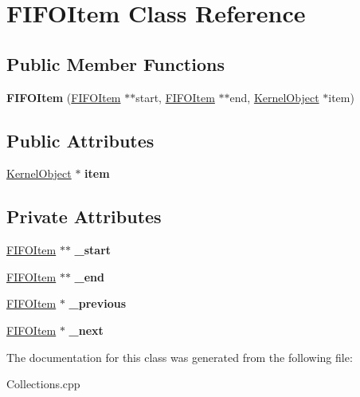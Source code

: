 \hypertarget{class_f_i_f_o_item}{}\section{F\+I\+F\+O\+Item Class Reference}
\label{class_f_i_f_o_item}
\subsection*{Public Member Functions}
\begin{DoxyCompactItemize}
\item 
\mbox{\label{class_f_i_f_o_item_a7650d9cf486522770f8092db4e723dd6}} 
{\bfseries F\+I\+F\+O\+Item} (\hyperlink{class_f_i_f_o_item}{F\+I\+F\+O\+Item} $\ast$$\ast$start, \hyperlink{class_f_i_f_o_item}{F\+I\+F\+O\+Item} $\ast$$\ast$end, \hyperlink{class_kernel_object}{Kernel\+Object} $\ast$item)
\end{DoxyCompactItemize}
\subsection*{Public Attributes}
\begin{DoxyCompactItemize}
\item 
\mbox{\label{class_f_i_f_o_item_af8be2d98e69407c5a4d9c004edd79629}} 
\hyperlink{class_kernel_object}{Kernel\+Object} $\ast$ {\bfseries item}
\end{DoxyCompactItemize}
\subsection*{Private Attributes}
\begin{DoxyCompactItemize}
\item 
\mbox{\label{class_f_i_f_o_item_a7a682c43d321c8190b719f712bfb5033}} 
\hyperlink{class_f_i_f_o_item}{F\+I\+F\+O\+Item} $\ast$$\ast$ {\bfseries \+\_\+start}
\item 
\mbox{\label{class_f_i_f_o_item_a604e993a66c03b8bb92aeb9a38119605}} 
\hyperlink{class_f_i_f_o_item}{F\+I\+F\+O\+Item} $\ast$$\ast$ {\bfseries \+\_\+end}
\item 
\mbox{\label{class_f_i_f_o_item_a88962d8827231a34a58091315a7885ed}} 
\hyperlink{class_f_i_f_o_item}{F\+I\+F\+O\+Item} $\ast$ {\bfseries \+\_\+previous}
\item 
\mbox{\label{class_f_i_f_o_item_a79213d288c782ab14af33519198c4e44}} 
\hyperlink{class_f_i_f_o_item}{F\+I\+F\+O\+Item} $\ast$ {\bfseries \+\_\+next}
\end{DoxyCompactItemize}


The documentation for this class was generated from the following file\+:\begin{DoxyCompactItemize}
\item 
Collections.\+cpp\end{DoxyCompactItemize}
